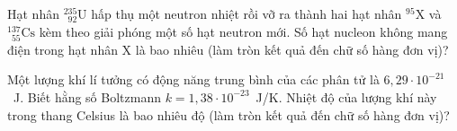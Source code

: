 	\begin{ex}%
		Hạt nhân ${}^{235}_{\phantom{2}92}\text{U}$ hấp thụ một neutron nhiệt rồi vỡ ra thành hai hạt nhân ${}^{95}\text{X}$ và ${}^{137}_{\phantom{1}55}\text{Cs}$ kèm theo giải phóng một số hạt neutron mới. Số hạt nucleon không mang điện trong hạt nhân X là bao nhiêu (làm tròn kết quả đến chữ số hàng đơn vị)?
		\par
	\end{ex}

	\begin{ex}%
		Một lượng khí lí tưởng có động năng trung bình của các phân tử là $6{,}29\cdot 10^{-21}$~J. Biết hằng số Boltzmann $k=1{,}38\cdot 10^{-23}$~J/K. Nhiệt độ của lượng khí này trong thang Celsius là bao nhiêu độ (làm tròn kết quả đến chữ số hàng đơn vị)?
		\par
	\end{ex}

